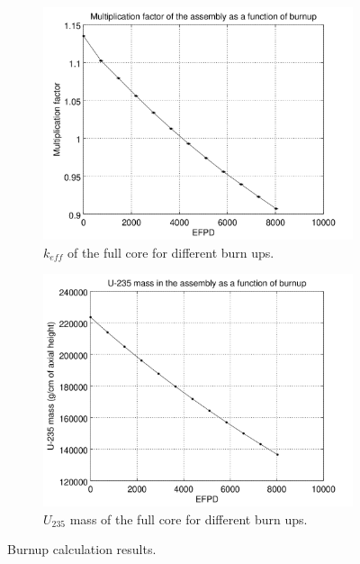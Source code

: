 \documentclass[11pt,letterpaper]{article}
\begin{document}
	\begin{figure}[htbp!]
		\centering
		\begin{subfigure}[t]{0.4\textwidth}
			\centering
			\includegraphics[width=\linewidth]{figures/Keff.png}
			\caption{$k_{eff}$ of the full core for different burn ups.}
		\end{subfigure}
		\begin{subfigure}[t]{0.4\textwidth}
			\centering
			\includegraphics[width=\linewidth]{figures/mU235.png}
			\caption{$U_{235}$ mass of the full core for different burn ups.}
		\end{subfigure}
		\hfill
		\caption{Burnup calculation results.}
		\label{fig:results2}
	\end{figure}
\end{document}
